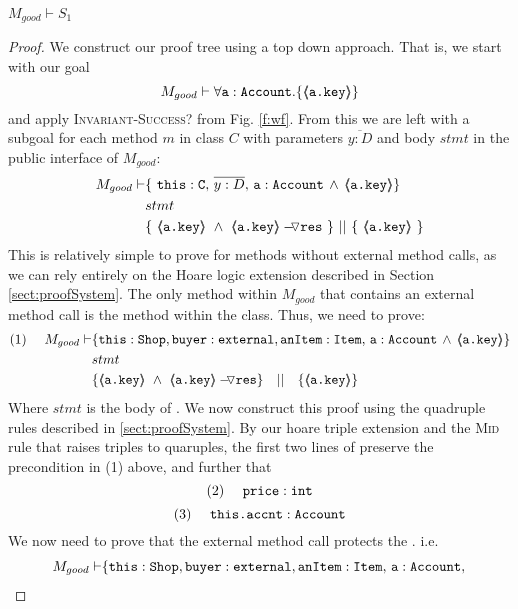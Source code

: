\begin{lemma}
\label{lemma:exampleKeyProtect}
$M_{good} \vdash S_1$
\end{lemma}
\begin{proof}
We construct our proof tree using a top down approach.  That is, we start with our goal
$$M_{good} \vdash \forall {\mbox{\normalfont{\texttt{a}}}:\mbox{\normalfont{\texttt{Account}}}}.{{\{}}{\langle\!\!\langle \mbox{\normalfont{\texttt{\mbox{\normalfont{\texttt{a.key}}}}}} \rangle\!\!\rangle}{{\}}}$$
and apply  \textsc{Invariant-Success?} from Fig. \ref{f:wf}.
From this we are left with a subgoal for each method $m$ in  class $C$ with parameters $\overline{y:D}$ and body $stmt$ in the public interface of $M_{good}$:
\small
\begin{align*}
M_{good} \vdash
		& \{ \ \prg{this}:\prg{C},\, \overline{y:D},\, \prg{a}:\prg{Account}\, \wedge\,
		   {\inside{\prg{a.key}}}\} \\
		& stmt\ \\
		& \{\ {\inside{\prg{a.key}}}\ \wedge\ {\PushASLong {\prg{res}} {\inside{\prg{a.key}}}}\ \}\ ||\ \{\ {\inside{\prg{a.key}}} \ 			\} 
\end{align*}
\normalsize
This is relatively simple to prove for methods without external method calls, as we can rely entirely on the Hoare logic extension described in Section \ref{sect:proofSystem}. The only  method within $M_{good}$ that contains 
an external method call is  the  method within the  class. Thus, we need to prove:
\small
\begin{align*}
\text{(1)}  \ \ \ \ M_{good} \vdash 
		&	\{  \prg{this}:\prg{Shop}, \prg{buyer} : \prg{external}, \prg{anItem} : \prg{Item},\, \prg{a}:\prg{Account}\,\wedge\, 
				{\inside{\prg{a.key}}} \} \\
		& stmt\ \\  
		& \{ {\inside{\prg{a.key}}}\ \wedge\ {\PushASLong {\prg{res}} {\inside{\prg{a.key}}}}  \} \ \ \  || \ \ \ 
		   \{ {\inside{\prg{a.key}}} \}
\end{align*}
\normalsize
Where $stmt$ is the body of . We now construct this proof using the quadruple rules described in \ref{sect:proofSystem}. By our hoare triple extension and the \textsc{Mid} rule that raises triples to quaruples, the first two lines
of \prg{buy} preserve the precondition in (1) above, and further that 
\small
$$
\text{(2)} \ \ \ \ \mbox{\normalfont{\texttt{price}}} : \mbox{\normalfont{\texttt{int}}}
$$ 
$$
\text{(3)} \ \ \ \ \prg{this.accnt} : \prg{Account}
$$ 
We now need to prove that the external method call  protects the . i.e.
\small
\begin{align*}
M_{good} \vdash & \{  \prg{this}:\prg{Shop}, \prg{buyer} : \prg{external}, \prg{anItem} : \prg{Item},\, \prg{a}:\prg{Account},\, \\

\end{align*}
\end{proof}
